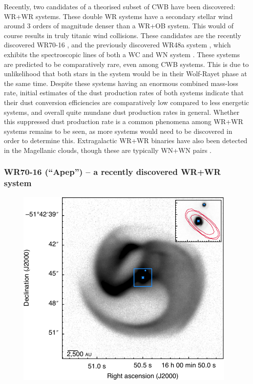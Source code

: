 Recently, two candidates of a theorised subset of CWB have been discovered: WR+WR systems.
These double WR systems have a secondary stellar wind around 3 orders of magnitude denser than a WR+OB system.
This would of course results in truly titanic wind collisions.
These candidates are the recently discovered WR70-16 \parencite{callinghamAnisotropicWindsWolf2019}, and the previously discovered WR48a system \parencite{danksInfraredSpectroscopyInfrared1983}, which exhibits the spectroscopic lines of both a WC and WN system \parencite{williamsVariableDustEmission2019}.
These systems are predicted to be comparatively rare, even among CWB systems.
This is due to unlikelihood that both stars in the system would be in their Wolf-Rayet phase at the same time.
Despite these systems having an enormous combined mass-loss rate, initial estimates of the dust production rates of both systems indicate that their dust conversion efficiencies are comparatively low compared to less energetic systems, and overall quite mundane dust production rates in general.
Whether this suppressed dust production rate is a common phenomena among WR+WR systems remains to be seen, as more systems would need to be discovered in order to determine this.
Extragalactic WR+WR binaries have also been detected in the Magellanic clouds, though these are typically WN+WN pairs \parencite{shenarWolfRayetBinaries2019}.

\subsubsection{WR70-16 (``Apep'') -- a recently discovered WR+WR system}
\label{sec:bg-apep}

\begin{figure}[h]
  \centering
  \includegraphics[]{assets/systems/apep-callingham-2019.pdf}
  \caption[\textit{VLT image of Apep \parencite{callinghamAnisotropicWindsWolf2019}}]{\textcite{callinghamAnisotropicWindsWolf2019}}
  \label{fig:apep-callingham}
\end{figure}

